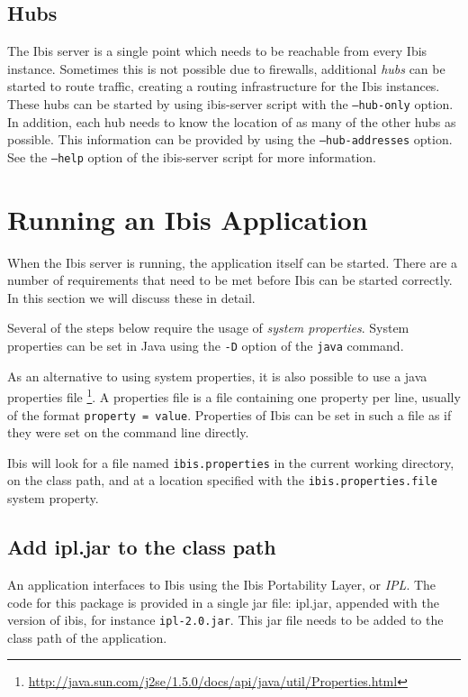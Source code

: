 \documentclass[a4paper,10pt]{article}
\begin{document}
\subsection{Hubs}
\label{hubs}

The Ibis server is a single point which needs to be reachable from every
Ibis instance. Sometimes this is not possible due to firewalls, additional 
\emph{hubs} can be started to route traffic, creating a routing infrastructure 
for the Ibis instances. These hubs can be started by using ibis-server script 
with the \texttt{--hub-only} option. In addition, each hub needs to know the 
location of as many of the other hubs as possible. This information can be 
provided by using the \texttt{--hub-addresses} option. See the
\texttt{--help} option of the ibis-server script for more information.

\section{Running an Ibis Application}

When the Ibis server is running, the application itself can be
started. There are a number of requirements that need to be met before 
Ibis can be started correctly. In this section we will discuss these in detail.

Several of the steps below require the usage of \emph{system properties}. 
System properties can be set in Java using the \texttt{-D} option of the 
\texttt{java} command. 

As an alternative to using system properties, it is also possible to use
a java properties file
\footnote{\url{http://java.sun.com/j2se/1.5.0/docs/api/java/util/Properties.html}}.
A properties file is a file containing one property per line, usually of
the format \texttt{property = value}. Properties of Ibis can be set in
such a file as if they were set on the command line directly.

Ibis will look for a file named \texttt{ibis.properties} in the current working
directory, on the class path, and at a location specified with the
\texttt{ibis.properties.file} system property.

\subsection{Add ipl.jar to the class path}

An application interfaces to Ibis using the Ibis Portability Layer, or
\emph{IPL}. The code for this package is provided in a single jar file:
ipl.jar, appended with the version of ibis, for instance \texttt{ipl-2.0.jar}.
This jar file needs to be added to the class path of the application.
\end{document}
